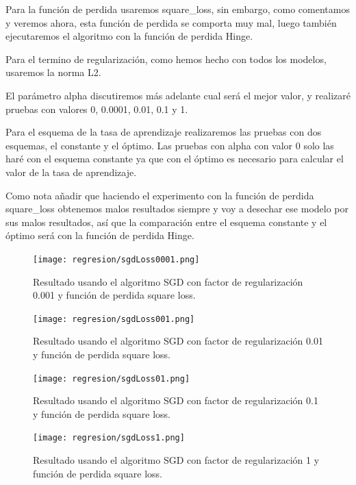 \documentclass[12pt, spanish]{article}
\begin{document}
Para la función de perdida usaremos square\_loss, sin embargo, como comentamos y veremos ahora, esta función de perdida se comporta muy mal, luego también ejecutaremos el algoritmo con la función de perdida Hinge.

Para el termino de regularización, como hemos hecho con todos los modelos, usaremos la norma L2.

El parámetro alpha discutiremos más adelante cual será el mejor valor, y realizaré pruebas con valores 0, 0.0001, 0.01, 0.1 y 1.

Para el esquema de la tasa de aprendizaje realizaremos las pruebas con dos esquemas, el constante y el óptimo. Las pruebas con alpha con valor 0 solo las haré con el esquema constante ya que con el óptimo es necesario para calcular el valor de la tasa de aprendizaje.

Como nota añadir que haciendo el experimento con la función de perdida square\_loss obtenemos malos resultados siempre y voy a desechar ese modelo por sus malos resultados, así que la comparación entre el esquema constante y el óptimo será con la función de perdida Hinge.


\begin{figure}[H]
	\centering
	\hspace*{-1cm}\texttt{[image: regresion/sgdLoss0001.png]}
	\caption{Resultado usando el algoritmo SGD con factor de regularización 0.001 y función de perdida square loss.}
	\label{SGDL0001}
\end{figure}

\begin{figure}[H]
	\centering
	\hspace*{-1cm}\texttt{[image: regresion/sgdLoss001.png]}
	\caption{Resultado usando el algoritmo SGD con factor de regularización 0.01 y función de perdida square loss.}
	\label{SGDL001}
\end{figure}


\begin{figure}[H]
	\centering
	\hspace*{-1cm}\texttt{[image: regresion/sgdLoss01.png]}
	\caption{Resultado usando el algoritmo SGD con factor de regularización 0.1 y función de perdida square loss.}
	\label{SGDL01}
\end{figure}


\begin{figure}[H]
	\centering
	\hspace*{-1cm}\texttt{[image: regresion/sgdLoss1.png]}
	\caption{Resultado usando el algoritmo SGD con factor de regularización 1 y función de perdida square loss.}
	\label{SGDL1}
\end{figure}
\end{document}
